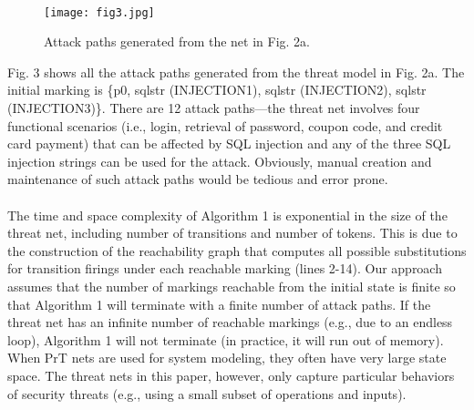 \paragraph{}
\begin{figure}
\centering
\texttt{[image: fig3.jpg]}
\caption{Attack paths generated from the net in Fig. 2a.}
\label{fig:figure 3}
\end{figure}
Fig. 3 shows all the attack paths generated from the threat model in Fig. 2a. The initial marking is \{p0, sqlstr (INJECTION1), sqlstr (INJECTION2), sqlstr (INJECTION3)\}. There are 12 attack paths—the threat net involves four functional
scenarios (i.e., login, retrieval of password, coupon code, and
credit card payment) that can be affected by SQL injection and any of the three SQL injection strings can be used for the attack. Obviously, manual creation and maintenance of such attack paths would be tedious and error prone.
\paragraph{}
The time and space complexity of Algorithm 1 is
exponential in the size of the threat net, including number
of transitions and number of tokens. This is due to the
construction of the reachability graph that computes all
possible substitutions for transition firings under each
reachable marking (lines 2-14). Our approach assumes that
the number of markings reachable from the initial state is
finite so that Algorithm 1 will terminate with a finite number
of attack paths. If the threat net has an infinite number of
reachable markings (e.g., due to an endless loop), Algorithm 1
will not terminate (in practice, it will run out of memory).
When PrT nets are used for system modeling, they often have
very large state space. The threat nets in this paper, however,
only capture particular behaviors of security threats (e.g.,
using a small subset of operations and inputs).
